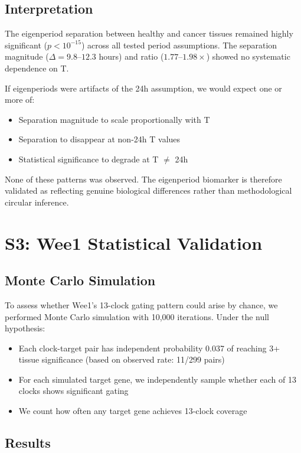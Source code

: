 \documentclass[11pt,a4paper]{article}
\begin{document}
\subsection{Interpretation}

The eigenperiod separation between healthy and cancer tissues remained highly significant ($p < 10^{-15}$) across all tested period assumptions. The separation magnitude ($\Delta = 9.8$--$12.3$ hours) and ratio ($1.77$--$1.98\times$) showed no systematic dependence on T.

If eigenperiods were artifacts of the 24h assumption, we would expect one or more of:
\begin{itemize}
    \item Separation magnitude to scale proportionally with T
    \item Separation to disappear at non-24h T values
    \item Statistical significance to degrade at T $\neq$ 24h
\end{itemize}

None of these patterns was observed. The eigenperiod biomarker is therefore validated as reflecting genuine biological differences rather than methodological circular inference.

\section{S3: Wee1 Statistical Validation}

\subsection{Monte Carlo Simulation}

To assess whether Wee1's 13-clock gating pattern could arise by chance, we performed Monte Carlo simulation with 10,000 iterations. Under the null hypothesis:

\begin{itemize}
    \item Each clock-target pair has independent probability 0.037 of reaching 3+ tissue significance (based on observed rate: 11/299 pairs)
    \item For each simulated target gene, we independently sample whether each of 13 clocks shows significant gating
    \item We count how often any target gene achieves 13-clock coverage
\end{itemize}

\subsection{Results}
\end{document}
